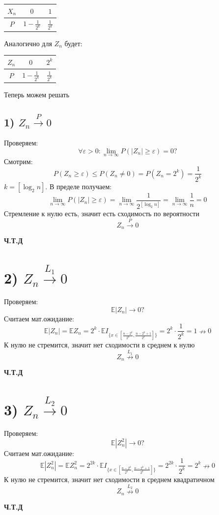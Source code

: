 \documentclass[a4paper,12pt]{article}
\begin{document}
\begin{center}
\begin{tabular}{|c|c|c|}
\hline
 $X_n$& $0$ & $1$ \\
\hline
 $P$& $1 - \frac{1}{2^k}$ &  $\frac{1}{2^k}$\\
\hline
\end{tabular}
\end{center}
Аналогично для $Z_n$ будет:

\begin{center}
\begin{tabular}{|c|c|c|}
\hline
 $Z_n$& $0$ & $2^k$ \\
\hline
 $P$& $1 - \frac{1}{2^k}$ &  $\frac{1}{2^k}$\\
\hline
\end{tabular}
\end{center}
Теперь можем решать
\subsection*{1) $Z_n \overset{P}{\longrightarrow} 0$}
Проверяем:
\[
\forall \varepsilon > 0 : \lim_{n \rightarrow \infty} P \left(|Z_n| \geq \varepsilon \right) = 0?
\]
Смотрим:
\[
P (Z_n \geq \varepsilon) \leq P(Z_n \neq 0) = P(Z_n = 2^k) = \frac{1}{2^k}
\]
$k = [\log_2 n]$. В пределе получаем:
\[
\lim_{n \rightarrow \infty} P \left(|Z_n| \geq \varepsilon \right) = \lim_{n \rightarrow \infty} \frac{1}{2^{[\log_2 n]}} = \lim_{n \rightarrow \infty} \frac{1}{n} = 0 
\]
Стремление к нулю есть, значит есть сходимость по вероятности
\[
Z_n \overset{P}{\longrightarrow} 0
\]
\begin{center}
\textbf{Ч.Т.Д} 
\end{center}
\section*{2) $Z_n \overset{L_1}{\longrightarrow} 0$}
Проверяем:
\[
\mathbb{E} |Z_n|  \rightarrow 0 ?
\]
Считаем мат.ожидание:
\[
\mathbb{E} |Z_n|  = \mathbb{E} Z_n = 2^k \cdot \mathbb{E}  I_{
\{
x \in  \left[
\frac{n - 2^k}{2^k}, \frac{n - 2^k + 1}{2^k}
\right]
\}
} 
=
2^k \cdot \frac{1}{2^k} 
= 1 \nrightarrow 0
\]
К нулю не стремится, значит нет сходимости в среднем к нулю
\[
Z_n \overset{L_1}{\nrightarrow} 0
\]
\begin{center}
\textbf{Ч.Т.Д} 
\end{center}
\section*{3)  $Z_n \overset{L_2}{\longrightarrow} 0$}
Проверяем:
\[
\mathbb{E} |Z_n^2|  \rightarrow 0 ?
\]
Считаем мат.ожидание:
\[
\mathbb{E} |Z_n^2|  = \mathbb{E} Z_n^2 = 2^{2k} \cdot \mathbb{E}  I_{
\{
x \in  \left[
\frac{n - 2^k}{2^k}, \frac{n - 2^k + 1}{2^k}
\right]
\}
} 
=
2^{2k} \cdot \frac{1}{2^k} 
= 2^k \nrightarrow 0
\]
К нулю не стремится, значит нет сходимости в среднем квадратичном
\[
Z_n \overset{L_2}{\nrightarrow} 0
\]
\begin{center}
\textbf{Ч.Т.Д} 
\end{center}
\end{document}

